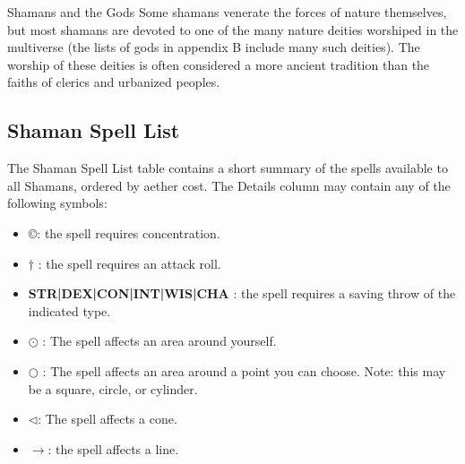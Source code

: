 \begin{DndComment}{Shamans and the Gods}
 Some shamans venerate the forces of nature themselves, but most shamans are devoted to one of the many nature deities worshiped in the multiverse (the lists of gods in appendix B include many such deities). The worship of these deities is often considered a more ancient tradition than the faiths of clerics and urbanized peoples.
\end{DndComment}

\subsection{Shaman Spell List}
The Shaman Spell List table contains a short summary of the spells available to all Shamans, ordered by aether cost. The Details column may contain any of the following symbols:
\begin{itemize}
	\item \copyright : the spell requires concentration.
	\item $\dagger$ : the spell requires an attack roll.
	\item \textbf{STR|DEX|CON|INT|WIS|CHA} : the spell requires a saving throw of the indicated type.
	\item $\odot$ : The spell affects an area around yourself.
	\item $\bigcirc$ : The spell affects an area around a point you can choose. Note: this may be a square, circle, or cylinder.
	\item $\triangleleft$: The spell affects a cone.
	\item $\rightarrow$: the spell affects a line.
\end{itemize}

